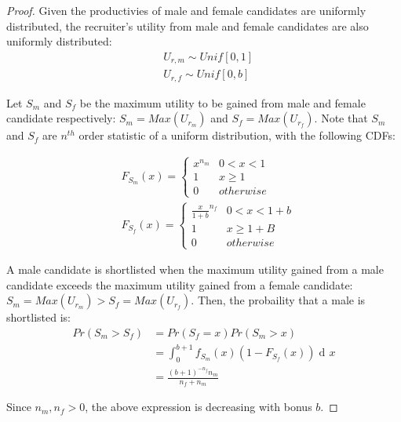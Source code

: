 \documentclass[11pt]{article}
\DeclareMathOperator{\di}{d\!}
\begin{document}
\begin{proof}
    Given the productivies of male and female candidates are uniformly distributed, the recruiter's utility from male and female candidates are also uniformly distributed:
    \begin{align*}
         & U_{r,m} \sim Unif[0,1] \\
         & U_{r,f} \sim Unif[0,b]
    \end{align*}

    Let $S_m$ and $S_f$ be the maximum utility to be gained from male and female candidate respectively:
    $S_m=Max(U_{r_m})$ and $S_f=Max(U_{r_f})$. Note that $S_m$ and $S_f$ are $n^{th}$ order statistic of a uniform distribution, with the following CDFs:

    \begin{align*}
         & F_{S_m}(x) =
        \begin{cases}
            x^{n_m} & 0 < x < 1 \\
            1       & x \geq 1  \\
            0       & otherwise
        \end{cases}
        \\
         & F_{S_f}(x) =
        \begin{cases}
            \frac{x}{1+b}^{n_f} & 0 < x < 1+b  \\
            1                   & x \geq 1 + B \\
            0                   & otherwise
        \end{cases}
    \end{align*}


    A male candidate is shortlisted when the maximum utility gained from a male candidate exceeds the maximum utility gained from a female candidate: $S_m=Max(U_{r_m}) > S_f=Max(U_{r_f})$. Then, the probaility that a male is shortlisted is:
    \begin{align*}
        Pr(S_m > S_f) & = Pr(S_f = x) Pr(S_m > x)                        \\
                      & = \int_{0}^{b+1} f_{S_m}(x) (1-F_{S_f}(x)) \di x \\
                      & = \frac{(b+1)^{-n_f} n_m}{n_f+n_m}
    \end{align*}

    Since $n_m, n_f >0$, the above expression is decreasing with bonus $b$.

\end{proof}
\end{document}
